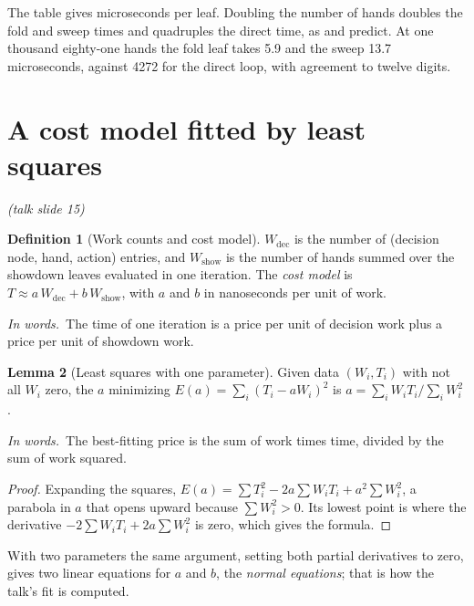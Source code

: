 \documentclass[11pt]{article}
\theoremstyle{definition}
\newtheorem{definition}{Definition}[section]
\newtheorem{lemma}[definition]{Lemma}
\newcommand{\inwords}{\par\smallskip\noindent\textit{In words.}\ }
\newcommand{\slide}[1]{\hfill{\small\itshape (talk slide #1)}}
\begin{document}
\begin{center}\end{center}
The table gives microseconds per leaf. Doubling the number of hands doubles the fold and sweep times and quadruples the
direct time, as  and  predict. At one thousand eighty-one hands the fold leaf takes 5.9
and the sweep 13.7 microseconds, against 4272 for the direct loop, with agreement to twelve digits.
\section{A cost model fitted by least squares}\label{sec:cost}\slide{15}
\begin{definition}[Work counts and cost model]\label{def:cost}
$W_{\text{dec}}$ is the number of (decision node, hand, action) entries, and $W_{\text{show}}$ is the number of hands summed
over the showdown leaves evaluated in one iteration. The \emph{cost model} is $T\approx a\,W_{\text{dec}}+b\,W_{\text{show}}$, with
$a$ and $b$ in nanoseconds per unit of work.
\inwords The time of one iteration is a price per unit of decision work plus a price per unit of showdown work.
\end{definition}

\begin{lemma}[Least squares with one parameter]\label{lem:ls1}
Given data $(W_i,T_i)$ with not all $W_i$ zero, the $a$ minimizing $E(a)=\sum_i(T_i-aW_i)^2$ is $a=\sum_iW_iT_i\big/\sum_iW_i^2$.
\inwords The best-fitting price is the sum of work times time, divided by the sum of work squared.
\end{lemma}
\begin{proof}
Expanding the squares, $E(a)=\sum T_i^2-2a\sum W_iT_i+a^2\sum W_i^2$, a parabola in $a$ that opens upward because
$\sum W_i^2>0$. Its lowest point is where the derivative $-2\sum W_iT_i+2a\sum W_i^2$ is zero, which gives the formula.
\end{proof}
With two parameters the same argument, setting both partial derivatives to zero, gives two linear equations for $a$ and
$b$, the \emph{normal equations}; that is how the talk's fit is computed.
\end{document}
